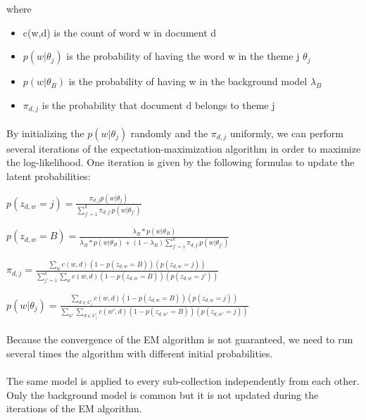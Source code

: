 where 

\begin{itemize}
\item c(w,d) is the count of word w in document d
\item $p(w|\theta_{j})$ is the probability of having the word w in the theme j $\theta_{j}$
\item $p(w|\theta_{B})$ is the probability of having w in the background model $\lambda_{B}$
\item $\pi_{d,j}$ is the probability that document d belongs to theme j
\end{itemize}

\paragraph{}
By initializing the $p(w|\theta_{j})$ randomly and the $\pi_{d,j}$ uniformly, we can perform several iterations of the expectation-maximization algorithm in order to maximize the log-likelihood. One iteration is given by the following formulas to update the latent probabilities:

\begin{center}
$p(z_{d,w} = j) = \frac{\pi_{d,j}p(w|\theta_{j})} {\sum_{j\prime=1}^{k} {\pi_{d,j\prime}p(w|\theta_{j\prime})} }$

$p(z_{d,w} = B) = \frac
{\lambda_{B}*p(w|\theta_{B})} 
{\lambda_{B}*p(w|\theta_{B}) + (1-\lambda_{B})
\sum_{j\prime=1}^{k} {\pi_{d,j\prime}p(w|\theta_{j\prime})}}$

$\pi_{d,j} = \frac
{\sum_{w}{c(w,d)(1-p(z_{d,w} = B))(p(z_{d,w} = j))}}
{\sum_{j\prime=1}^{k}{\sum_{w}{c(w,d)(1-p(z_{d,w} = B))(p(z_{d,w} = j\prime))}}}$

$p(w|\theta_{j}) = \frac
{\sum_{d\in C_{i}}{c(w,d)(1-p(z_{d,w} = B))(p(z_{d,w} = j))}}
{\sum_{w\prime}{
\sum_{d \in C_{i}} {c(w\prime,d)(1-p(z_{d,w\prime} = B))(p(z_{d,w\prime} = j))}}}$

\end{center}

\paragraph{}
Because the convergence of the EM algorithm is not guaranteed, we need to run several times the algorithm with different initial probabilities.

\paragraph{}
The same model is applied to every sub-collection independently from each other. Only the background model is common but it is not updated during the iterations of the EM algorithm. 

